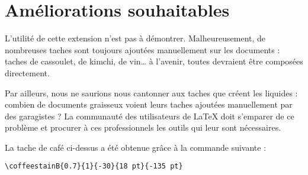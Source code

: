 \documentclass[a4paper, 11pt, BCOR = 0 pt, DIV = 13, oneside, french]{scrartcl}
\begin{document}
\section{Améliorations souhaitables}
L'utilité de cette extension n'est pas à démontrer. Malheureusement, de
nombreuses taches sont toujours ajoutées manuellement sur les documents : taches
de cassoulet, de kimchi, de vin\dots{} à l'avenir, toutes devraient être composées directement.

Par ailleurs, nous ne saurions nous cantonner aux taches que créent les
liquides : combien de documents graisseux voient leurs taches ajoutées
manuellement par des garagistes ? La communauté des utilisateurs de \LaTeX{}
doit s'emparer de ce problème et procurer à ces professionnels les outils qui leur
sont nécessaires.

\vfill{}

\begin{tcolorbox}
  La tache de café ci-dessus a été obtenue grâce à la commande suivante :

  \verb|\coffeestainB{0.7}{1}{-30}{18 pt}{-135 pt}|
\end{tcolorbox}
\newpage{}
\end{document}
